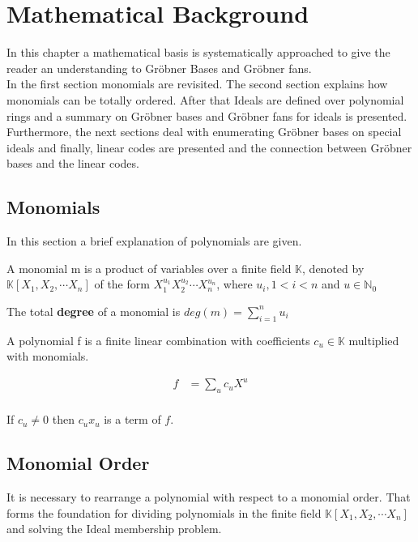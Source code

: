 \section{Mathematical Background}
\label{sec:background}

In this chapter a mathematical basis is systematically approached to give the reader an understanding to Gröbner Bases and Gröbner fans.\\
In the first section monomials are revisited. The second section explains how monomials can be totally ordered.
After that Ideals are defined over polynomial rings and a summary on Gröbner bases and Gröbner fans for ideals is presented. Furthermore, the next sections deal with enumerating Gröbner bases on special ideals and finally, linear codes are presented and the connection between Gröbner bases and the linear codes.  

\subsection{Monomials}
\label{subseb:Monomials}

In this section a brief explanation of polynomials are given.

\begin{env_definition}[Monomial] 

A monomial m is a product of variables over a finite field $\mathbb{K}$, denoted by $ \mathbb{K} \left[X_{1},X_{2},\cdots X_{n}\right]  $ of the form $X_{1}^{u_{1}}X_{2}^{u_{2}}\cdots X_{n}^{u_{n}}$, where $u_{i}, 1 < i < n $ and $u \in \mathbb{N}_{0} $
\end{env_definition}
The total \textbf{degree} of a monomial is $deg(m) = \sum_{i=1}^n u_i $ 


\begin{env_definition}[Polynomial]

A polynomial f is a finite linear combination with coefficients $c_{u} \in \mathbb{K}$ multiplied with monomials.


\begin{align*}
	f &= \sum_{u} c_{u}X^{u} \\
\end{align*}

\end{env_definition}
If $c_{u}\neq0$ then $c_{u}x_{u}$ is a term of $f$.





\subsection{Monomial Order}
\label{subsec:Monomialorder}
It is necessary to rearrange a polynomial with respect to a monomial order. That forms the foundation for dividing polynomials in the finite field
$ \mathbb{K} \left[X_{1},X_{2},\cdots X_{n}\right]~$ and solving the Ideal membership problem.

